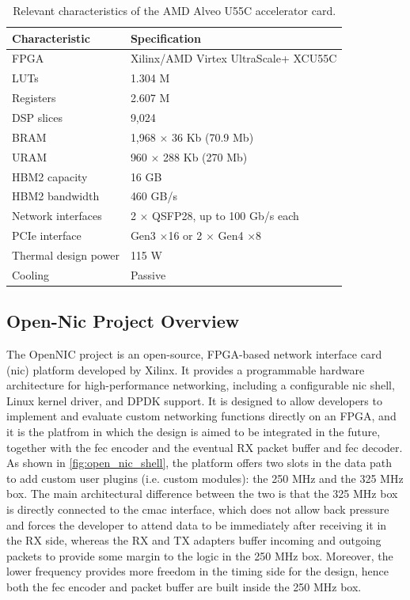 \begin{table}[ht]
    \centering
    \begin{tabular}{ll}
        \hline
        \textbf{Characteristic} & \textbf{Specification} \\
        \hline
        FPGA & Xilinx/AMD Virtex UltraScale+ XCU55C \\
        LUTs & 1.304 M \\
        Registers & 2.607 M \\
        DSP slices & 9,024 \\
        BRAM & 1,968 $\times$ 36 Kb (70.9 Mb) \\
        URAM & 960 $\times$ 288 Kb (270 Mb) \\
        HBM2 capacity & 16 GB \\
        HBM2 bandwidth & 460 GB/s \\
        Network interfaces & 2 $\times$ QSFP28, up to 100 Gb/s each \\
        PCIe interface & Gen3 $\times$16 or 2 $\times$ Gen4 $\times$8 \\
        Thermal design power & 115 W \\
        Cooling & Passive \\
        \hline
    \end{tabular}
    \caption{Relevant characteristics of the AMD Alveo U55C accelerator card.} \label{tab:u55c_specs}
\end{table}

\subsection{Open-Nic Project Overview}\label{open-nic}
The OpenNIC project \cite{amd_opennic} is an open-source, FPGA-based network interface card (\gls{nic}) platform developed by Xilinx.
It provides a programmable hardware architecture for high-performance networking, including a configurable
\gls{nic} shell, Linux kernel driver, and DPDK support. It is designed to allow developers to implement
and evaluate custom networking functions directly on an FPGA, and it is the platfrom in which
the design is aimed to be integrated in the future, together with the \gls{fec} encoder and the eventual
RX packet buffer and \gls{fec} decoder. \\

As shown in \ref{fig:open_nic_shell}, 
the platform offers two slots in the data path to add custom user plugins (i.e. custom modules): the 250 MHz and 
the 325 MHz box. The main architectural difference between the two is that the 325 MHz box is directly connected 
to the \gls{cmac} interface, which does not allow back pressure and forces the developer to attend data to be immediately 
after receiving it in the RX side, whereas the RX and TX adapters buffer incoming and outgoing packets to provide some 
margin to the logic in the 250 MHz box. Moreover, the lower frequency provides more freedom in the timing side 
for the design, hence both the \gls{fec} encoder and packet buffer are built inside the 250 MHz box.

